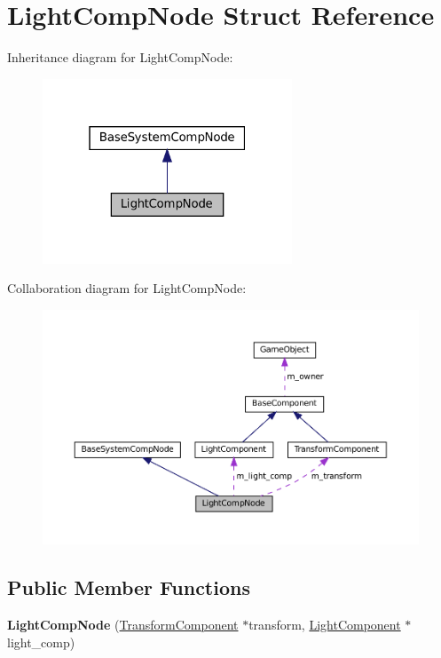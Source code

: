 \hypertarget{structLightCompNode}{}\section{Light\+Comp\+Node Struct Reference}
\label{structLightCompNode}


Inheritance diagram for Light\+Comp\+Node\+:\nopagebreak
\begin{figure}[H]
\begin{center}
\leavevmode
\includegraphics[width=211pt]{structLightCompNode__inherit__graph}
\end{center}
\end{figure}


Collaboration diagram for Light\+Comp\+Node\+:\nopagebreak
\begin{figure}[H]
\begin{center}
\leavevmode
\includegraphics[width=350pt]{structLightCompNode__coll__graph}
\end{center}
\end{figure}
\subsection*{Public Member Functions}
\begin{DoxyCompactItemize}
\item 
\mbox{\label{structLightCompNode_a4154dc879adf648086b0ec933c5f1139}} 
{\bfseries Light\+Comp\+Node} (\hyperlink{classTransformComponent}{Transform\+Component} $\ast$transform, \hyperlink{classLightComponent}{Light\+Component} $\ast$light\+\_\+comp)
\end{DoxyCompactItemize}
